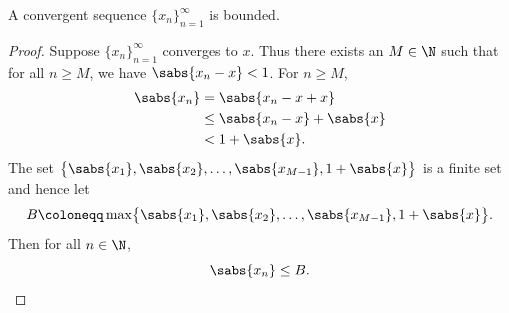 \begin{prop}
A convergent sequence $\{ x_n \}_{n=1}^\infty$ is bounded.
\end{prop}

\begin{proof}
Suppose $\{ x_n \}_{n=1}^\infty$ converges to $x$.  Thus there exists an $M \in \N$
such that for all $n \geq M$, we have
$\sabs{x_n - x} < 1$.  For $n \geq M$,
\begin{equation*}
\begin{split}
\sabs{x_n} & = \sabs{x_n - x + x}
\\
& \leq \sabs{x_n - x} + \sabs{x}
\\
& < 1 + \sabs{x} .
\end{split}
\end{equation*}
The set $\bigl\{ \sabs{x_1}, \sabs{x_2}, \ldots, \sabs{x_{M-1}} , 1+\sabs{x} \bigr\}$
is a finite set and hence let
\begin{equation*}
B \coloneqq \max \bigl\{ \sabs{x_1}, \sabs{x_2}, \ldots, \sabs{x_{M-1}}, 1+\sabs{x} \bigr\} .
\end{equation*}
Then for all $n \in \N$,
\begin{equation*}
\sabs{x_n} \leq B. \qedhere
\end{equation*}
\end{proof}
